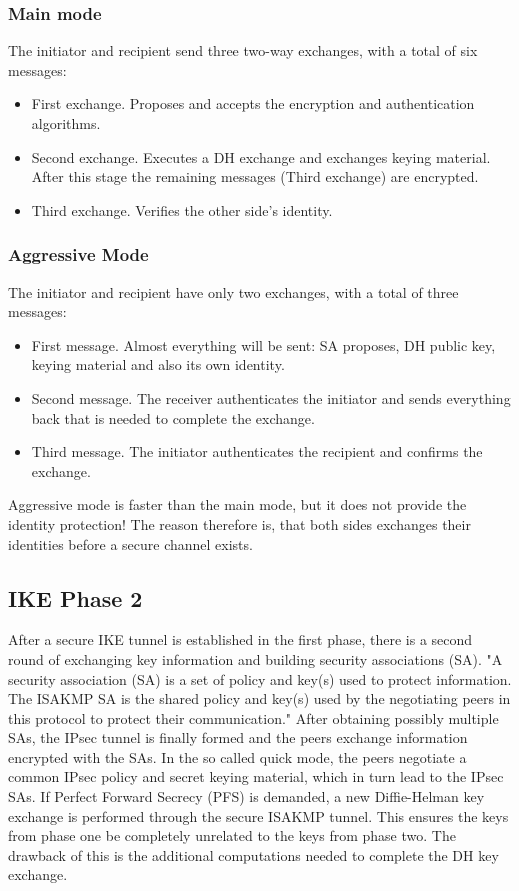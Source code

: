 \documentclass[a4paper]{report}
\begin{document}
\subsubsection{Main mode}
\label{sssec:Phase1:mainMode}
The initiator and recipient send three two-way exchanges, with a total of six messages:
\begin{itemize}
	\item First exchange. Proposes and accepts the encryption and authentication algorithms.
	\item Second exchange. Executes a DH exchange and exchanges keying material. After this stage  the remaining messages (Third exchange) are encrypted.
	\item Third exchange.  Verifies the other side's identity.
\end{itemize}

\subsubsection{Aggressive Mode}
\label{sssec:Phase1:aggressiveMode}
The initiator and recipient have only two exchanges, with a total of three messages:
\begin{itemize}
	\item First message. Almost everything will be sent: SA proposes, DH public key, keying material and also its own identity.
	\item Second message. The receiver authenticates the initiator and sends everything back that is needed to complete the exchange.
	\item Third message. The initiator authenticates the recipient and confirms the exchange.
\end{itemize}
Aggressive mode is faster than the main mode, but it does not provide the identity protection! The reason therefore is, that both sides exchanges their identities before a secure channel exists. \parencite{JuniperNetworks2016}

\subsection{IKE Phase 2}
\label{ssec:Phase2}
After a secure IKE tunnel is established in the first phase, there is a second round of exchanging key information and building security associations (SA). "A security association (SA) is a set of policy and key(s) used to protect information. The ISAKMP SA is the shared policy and key(s) used by the negotiating peers in this protocol to protect their communication." \parencite{Harkins1998} After obtaining possibly multiple SAs, the IPsec tunnel is finally formed and the peers exchange information encrypted with the SAs. In the so called quick mode, the peers negotiate a common IPsec policy and secret keying material, which in turn lead to the IPsec SAs. If Perfect Forward Secrecy (PFS) is demanded, a new Diffie-Helman key exchange is performed through the secure ISAKMP tunnel. This ensures the keys from phase one be completely unrelated to the keys from phase two. The drawback of this is the additional computations needed to complete the DH key exchange.
\end{document}
